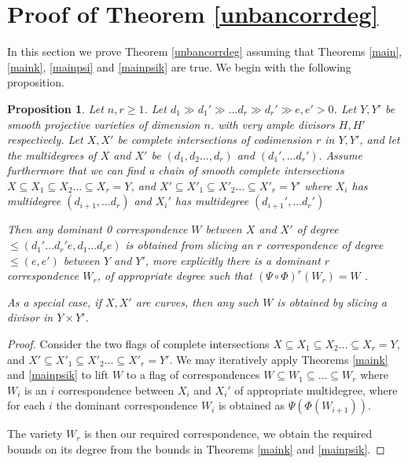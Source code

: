 \documentclass[12pt]{amsart}
\numberwithin{equation}{section}
\newtheorem{proposition}[theorem]{Proposition}
\numberwithin{theorem}{section}
\theoremstyle{definition}
\theoremstyle{definition}
\begin{document}
\section{Proof of Theorem \ref{unbancorrdeg}}
In this section we prove Theorem \ref{unbancorrdeg} assuming that Theorems \ref{main}, \ref{maink}, \ref{mainpsi} and \ref{mainpsik} are true.
We begin with the following proposition.
\begin{proposition}\label{unban}
    Let $n,r \ge 1$.
    Let $d_1 \gg d_1' \gg \dots d_r \gg d_r' \gg e, e' >0$.
    Let $Y, Y'$ be smooth projective varieties of dimension $n$. with very ample divisors $H, H'$  respectively. Let $X, X'$ be complete intersections of codimension $r$ in $Y, Y'$, and let  the multidegrees of $X$ and $X'$ be $(d_1, d_2 \dots, d_r)$ and $(d_1' ,\dots d_r').$ Assume furthermore that we can find a chain of smooth complete intersections $X \subseteq X_1 \subseteq X_2 \dots \subseteq X_r = Y $, and $X' \subseteq X'_1 \subseteq X'_2 \dots \subseteq X'_r = Y' $ where $X_i$ has multidegree $(d_{i+1}, \dots d_r)$ and $X_i'$ has multidegree $(d_{i+1}', \dots d_r')$
    
    
     Then any dominant 0 correspondence $W$ between $X$ and $X'$ of degree $ \le (d_1' \dots d_r' e, d_1 \dots d_r e)$ is obtained from slicing an $r$ correspondence of degree $\le (e,e')$ between $Y$ and $Y'$, more explicitly there is a dominant  $r$ correspondence $W_r$, of appropriate degree such that $(\Psi \circ \Phi)^r (W_r) = W$ .

    As a special case, if $X,X'$ are curves, then any such $W$ is obtained by slicing a divisor in $Y \times Y'$.
\end{proposition}
\begin{proof}
    Consider the two flags of complete intersections $X \subseteq X_1 \subseteq X_2 \dots \subseteq X_r = Y $, and $X' \subseteq X'_1 \subseteq X'_2 \dots \subseteq X'_r = Y' $. We may iteratively apply Theorems \ref{maink} and \ref{mainpsik} to lift $W$ to a flag of  correspondences $ W \subseteq W_1 \subseteq \dots \subseteq  W_r$ where $W_i$ is an $i$ correspondence between $X_i$ and $X_i'$ of appropriate multidegree, where for each $i$ the dominant correspondence $W_i$ is obtained as $\Psi (\Phi(W_{i+1})).$
    
     The variety $W_r$ is then our required correspondence, we obtain the required bounds on its degree from the bounds in Theorems \ref{maink} and \ref{mainpsik}.
\end{proof}
\end{document}
